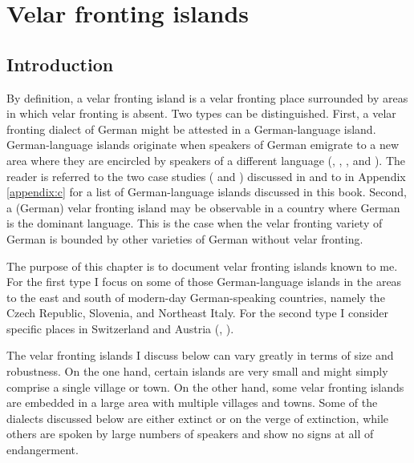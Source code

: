 \chapter{Velar fronting islands}\label{sec:15}

\section{Introduction}\label{sec:15.1}

By definition, a velar fronting island is a velar fronting place surrounded by areas in which velar fronting is absent. Two types can be distinguished. First, a velar fronting dialect of German might be attested in a German-language island. German-language islands originate when speakers of German emigrate to a new area where they are encircled by speakers of a different language (\citealt{Wiesinger1980}, \citealt{Wiesinger1983b}, \citealt[76--83]{Boas2009}, and \citealt{Putnam2011}). The reader is referred to the two case studies ( and ) discussed in  and to  in Appendix \ref{appendix:c} for a list of German-language islands discussed in this book. Second, a (German) velar fronting island may be observable in a country where German is the dominant language. This is the case when the velar fronting variety of German is bounded by other varieties of German without velar fronting.

The purpose of this chapter is to document velar fronting islands known to me. For the first type I focus on some of those German-language islands in the areas to the east and south of modern-day German-speaking countries, namely the Czech Republic, Slovenia, and Northeast Italy. For the second type I consider specific places in Switzerland and Austria (, ).

The velar fronting islands I discuss below can vary greatly in terms of size and robustness. On the one hand, certain islands are very small and might simply comprise a single village or town. On the other hand, some velar fronting islands are embedded in a large area with multiple villages and towns. Some of the dialects discussed below are either extinct or on the verge of extinction, while others are spoken by large numbers of speakers and show no signs at all of endangerment.

